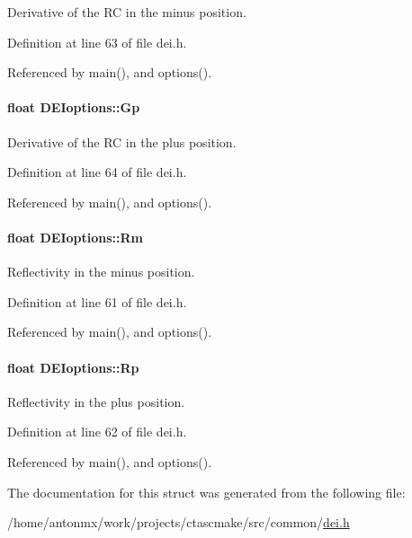 Derivative of the RC in the minus position. 



Definition at line 63 of file dei.h.



Referenced by main(), and options().

\hypertarget{structDEIoptions_a295b3d9567d0ec3bf1a76f7bcbef7506}{
\paragraph[{Gp}]{\setlength{\rightskip}{0pt plus 5cm}float {\bf DEIoptions::Gp}}\hfill}
\label{structDEIoptions_a295b3d9567d0ec3bf1a76f7bcbef7506}


Derivative of the RC in the plus position. 



Definition at line 64 of file dei.h.



Referenced by main(), and options().

\hypertarget{structDEIoptions_a420f0a69a13203ebf2f2b3dc3429e5b5}{
\paragraph[{Rm}]{\setlength{\rightskip}{0pt plus 5cm}float {\bf DEIoptions::Rm}}\hfill}
\label{structDEIoptions_a420f0a69a13203ebf2f2b3dc3429e5b5}


Reflectivity in the minus position. 



Definition at line 61 of file dei.h.



Referenced by main(), and options().

\hypertarget{structDEIoptions_a3229197ff2c66b06838381221d80d8ce}{
\paragraph[{Rp}]{\setlength{\rightskip}{0pt plus 5cm}float {\bf DEIoptions::Rp}}\hfill}
\label{structDEIoptions_a3229197ff2c66b06838381221d80d8ce}


Reflectivity in the plus position. 



Definition at line 62 of file dei.h.



Referenced by main(), and options().



The documentation for this struct was generated from the following file:\begin{DoxyCompactItemize}
\item 
/home/antonmx/work/projects/ctascmake/src/common/\hyperlink{dei_8h}{dei.h}\end{DoxyCompactItemize}
